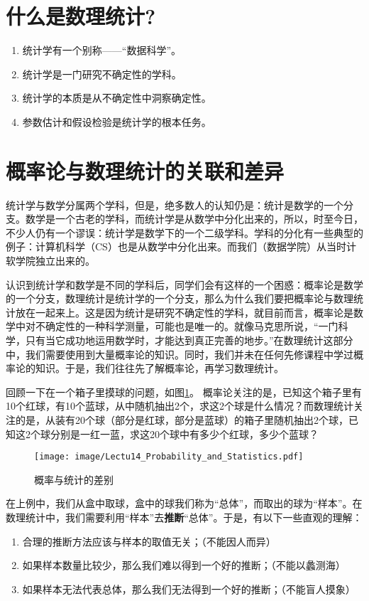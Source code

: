 \section{什么是数理统计?}

\begin{enumerate}
\item 统计学有一个别称——“数据科学”。
\item 统计学是一门研究不确定性的学科。
\item 统计学的本质是从不确定性中洞察确定性。
\item 参数估计和假设检验是统计学的根本任务。
\end{enumerate}

\section{概率论与数理统计的关联和差异}
统计学与数学分属两个学科，但是，绝多数人的认知仍是：统计是数学的一个分支。数学是一个古老的学科，而统计学是从数学中分化出来的，所以，时至今日，不少人仍有一个谬误：统计学是数学下的一个二级学科。学科的分化有一些典型的例子：计算机科学（CS）也是从数学中分化出来。而我们（数据学院）从当时计软学院独立出来的。

认识到统计学和数学是不同的学科后，同学们会有这样的一个困惑：概率论是数学的一个分支，数理统计是统计学的一个分支，那么为什么我们要把概率论与数理统计放在一起来上。这是因为统计是研究不确定性的学科，就目前而言，概率论是数学中对不确定性的一种科学测量，可能也是唯一的。就像马克思所说，“一门科学，只有当它成功地运用数学时，才能达到真正完善的地步。”在数理统计这部分中，我们需要使用到大量概率论的知识。同时，我们并未在任何先修课程中学过概率论的知识。于是，我们往往先了解概率论，再学习数理统计。

回顾一下在一个箱子里摸球的问题，如图\ref{fig:lect14_Prob&Stat1}。
概率论关注的是，已知这个箱子里有10个红球，有10个蓝球，从中随机抽出2个，求这2个球是什么情况？而数理统计关注的是，从装有20个球（部分是红球，部分是蓝球）的箱子里随机抽出2个球，已知这2个球分别是一红一蓝，求这20个球中有多少个红球，多少个蓝球？
\begin{figure}[ht]
    \centering
\texttt{[image: image/Lectu14\_Probability\_and\_Statistics.pdf]}
\vspace{1cm}
    \caption{概率与统计的差别}
    \label{fig:lect14_Prob&Stat1}
\end{figure}

在上例中，我们从盒中取球，盒中的球我们称为“总体”，而取出的球为“样本”。在数理统计中，我们需要利用“样本”去\textbf{推断}“总体”。于是，有以下一些直观的理解：
\begin{enumerate}
    \item 合理的推断方法应该与样本的取值无关；（不能因人而异）
    \item 如果样本数量比较少，那么我们难以得到一个好的推断；（不能以蠡测海）
    \item 如果样本无法代表总体，那么我们无法得到一个好的推断；（不能盲人摸象）
\end{enumerate}

